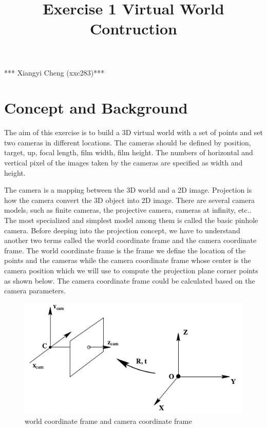 \documentclass[11pt]{article}
\title{Exercise 1  Virtual World Contruction}
\makeatletter
\def\maxwidth{\ifdim\Gin@nat@width>\linewidth\linewidth
    \else\Gin@nat@width\fi}
\let\Oldincludegraphics\includegraphics
\renewcommand{\includegraphics}[1]{\Oldincludegraphics[width=.8\maxwidth]{#1}}
\makeatother
\begin{document}
    
    
    \maketitle
    
    

    
    *** Xiangyi Cheng (xxc283)***

    \hypertarget{concept-and-background}{%
\section{Concept and Background}\label{concept-and-background}}

    The aim of this exercise is to build a 3D virtual world with a set of
points and set two cameras in different locations. The cameras should be
defined by position, target, up, focal length, film width, film height.
The numbers of horizontal and vertical pixel of the images taken by the
cameras are specified as width and height.

The camera is a mapping between the 3D world and a 2D image. Projection
is how the camera convert the 3D object into 2D image. There are several
camera models, such as finite cameras, the projective camera, cameras at
infinity, etc.. The most specialized and simplest model among them is
called the basic pinhole camera. Before deeping into the projection
concept, we have to understand another two terms called the world
coordinate frame and the camera coordinate frame. The world coordinate
frame is the frame we define the location of the points and the cameras
while the camera coordinate frame whose center is the camera position
which we will use to compute the projection plane corner points as shown
below. The camera coordinate frame could be calculated based on the
camera parameters.

\begin{figure}
\centering
\includegraphics{trans.png}
\caption{world coordinate frame and camera coordinate frame}
\end{figure}
\end{document}
